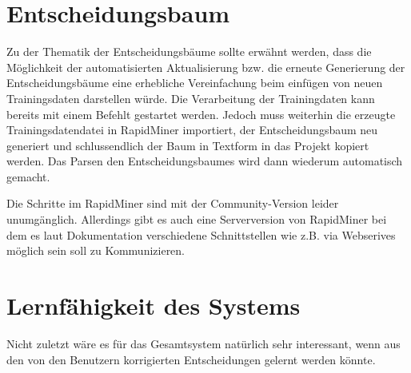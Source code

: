 \section{Entscheidungsbaum}
Zu der Thematik der Entscheidungsbäume sollte erwähnt werden, dass die Möglichkeit der automatisierten Aktualisierung bzw. die erneute Generierung der Entscheidungsbäume eine erhebliche Vereinfachung beim einfügen von neuen Trainingsdaten darstellen würde. Die Verarbeitung der Trainingdaten kann bereits mit einem Befehlt gestartet werden. Jedoch muss weiterhin die erzeugte Trainingsdatendatei in RapidMiner importiert, der Entscheidungsbaum neu generiert und schlussendlich der Baum in Textform in das Projekt kopiert werden. Das Parsen den Entscheidungsbaumes wird dann wiederum automatisch gemacht. 

Die Schritte im RapidMiner sind mit der Community-Version leider unumgänglich. Allerdings gibt es auch eine Serverversion von RapidMiner bei dem es laut Dokumentation verschiedene Schnittstellen wie z.B. via Webserives möglich sein soll zu Kommunizieren. 

\section{Lernfähigkeit des Systems}
Nicht zuletzt wäre es für das Gesamtsystem natürlich sehr interessant, wenn aus den von den Benutzern korrigierten Entscheidungen gelernt werden könnte. 


